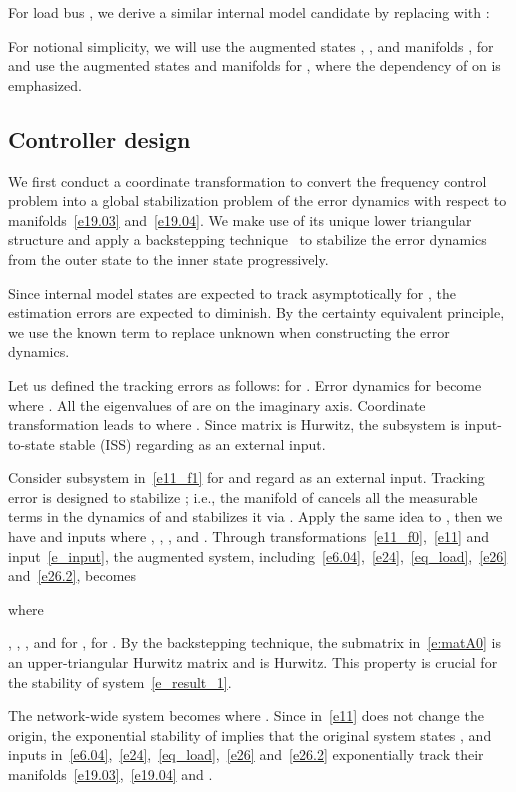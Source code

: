 \documentclass[journal]{IEEEtran}
\begin{document}
For load bus , we derive a similar internal model candidate by replacing  with :

For notional simplicity, we will use the augmented states , ,  and manifolds ,    for  and use the augmented states  and manifolds  for , where the dependency of  on  is emphasized.

\subsection{Controller design}\label{sec:coo1}
We first conduct a coordinate transformation to convert the frequency control problem into a global stabilization
problem of the error dynamics with respect to manifolds~\eqref{e19.03} and~\eqref{e19.04}.
We make use of its unique lower triangular structure and apply a backstepping technique~\cite{KKK:95} to stabilize the error dynamics from the outer state to the inner state progressively.

Since internal model states  are expected to track  asymptotically for , the estimation errors  are expected to diminish.
By the certainty equivalent principle, we use the known term 
to replace unknown  when constructing the error dynamics.

Let us defined the tracking errors as follows:  for . Error dynamics for  become  where . All the eigenvalues of  are on the imaginary axis. Coordinate transformation  leads to  where . Since matrix  is Hurwitz, the subsystem  is input-to-state stable (ISS) regarding  as an external input.

Consider subsystem  in~\eqref{e11_f1} for  and regard  as an external input. Tracking error  is designed to stabilize ; i.e., the manifold  of  cancels all the measurable terms in the dynamics of  and stabilizes it via . Apply the same idea to , then we have   and inputs  where , , , and . Through transformations~\eqref{e11_f0},~\eqref{e11} and input~\eqref{e_input}, the augmented system, including~\eqref{e6.04},~\eqref{e24},~\eqref{eq_load},~\eqref{e26} and~\eqref{e26.2}, becomes

where

,
 ,
 ,
and    for ,  for .
By the backstepping technique, the  submatrix in~\eqref{e:matA0} is an upper-triangular Hurwitz matrix and  is Hurwitz. This property is crucial for the stability of system~\eqref{e_result_1}.

The network-wide system becomes  where .
Since  in~\eqref{e11} does not change the origin, the exponential stability of  implies that the original system states , and inputs  in~\eqref{e6.04},~\eqref{e24},~\eqref{eq_load},~\eqref{e26} and~\eqref{e26.2} exponentially track their manifolds~\eqref{e19.03},~\eqref{e19.04} and . 
\end{document}
